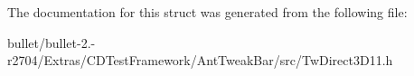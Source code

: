 The documentation for this struct was generated from the following file\+:\begin{DoxyCompactItemize}
\item 
bullet/bullet-\/2.-\/r2704/\+Extras/\+C\+D\+Test\+Framework/\+Ant\+Tweak\+Bar/src/Tw\+Direct3\+D11.\+h\end{DoxyCompactItemize}
